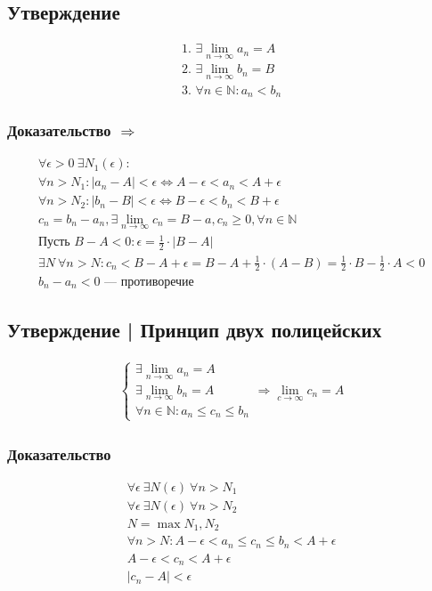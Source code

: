 \documentclass{article}
\begin{document}
\subsection{Утверждение}
\begin{gather*}
    \text{1. } \exists \lim_{n \to \infty} a_n = A \\
    \text{2. } \exists \lim_{n \to \infty} b_n = B \\
    \text{3. } \forall n \in \mathbb{N}: a_n < b_n
\end{gather*}

\subsubsection{Доказательство $\Rightarrow$}
\begin{gather*}
    \forall \epsilon > 0 ~ \exists N_1(\epsilon): \\
    \forall n > N_1: |a_n - A| < \epsilon \Leftrightarrow A - \epsilon < a_n < A + \epsilon \\
    \forall n > N_2: |b_n - B| < \epsilon \Leftrightarrow B - \epsilon < b_n < B + \epsilon \\
    c_n = b_n - a_n, \exists \lim_{n \to \infty} c_n = B - a, c_n \ge 0, \forall n \in \mathbb{N} \\
    \text{Пусть } B - A < 0: \epsilon = \frac{1}{2} \cdot |B - A| \\
    \exists N ~ \forall n > N: c_n < B - A + \epsilon = B - A + \frac{1}{2} \cdot (A - B) = \frac{1}{2} \cdot B - \frac{1}{2} \cdot A < 0 \\
    b_n - a_n < 0 \text{ --- противоречие}
\end{gather*}


\subsection{Утверждение | Принцип двух полицейских}
\begin{gather*}
	\begin{cases}
		\exists \lim_{n \to \infty} a_n = A \\
		\exists \lim_{n \to \infty} b_n = A \\
		\forall n \in \mathbb{N}: a_n \le c_n \le b_n
	\end{cases} \Rightarrow \lim_{c \to \infty} c_n = A
\end{gather*}

\subsubsection{Доказательство}
\begin{gather*}
    \forall \epsilon ~ \exists N(\epsilon) ~ \forall n > N_1 \\
    \forall \epsilon ~ \exists N(\epsilon) ~ \forall n > N_2 \\
    N = \max{N_1, N_2} \\
    \forall n > N: A - \epsilon < a_n \le c_n \le b_n < A + \epsilon \\
    A - \epsilon < c_n < A + \epsilon \\
    |c_n - A| < \epsilon
\end{gather*}
\end{document}
